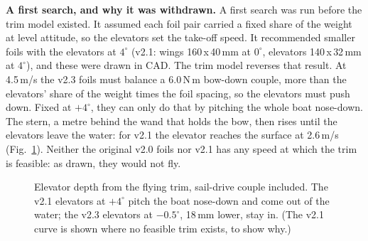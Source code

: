 \documentclass[10pt,twocolumn]{article}
\begin{document}
\noindent\textbf{A first search, and why it was withdrawn.} A first search was run before the trim model existed. It assumed each foil pair carried a fixed share of the weight at level attitude, so the elevators set the take-off speed. It recommended smaller foils with the elevators at $4^\circ$ (v2.1: wings 160\,x\,40\,mm at $0^\circ$, elevators 140\,x\,32\,mm at $4^\circ$), and these were drawn in CAD. The trim model reverses that result. At 4.5\,m/s the v2.3 foils must balance a 6.0\,N\,m bow-down couple, more than the elevators' share of the weight times the foil spacing, so the elevators must push down. Fixed at $+4^\circ$, they can only do that by pitching the whole boat nose-down. The stern, a metre behind the wand that holds the bow, then rises until the elevators leave the water: for v2.1 the elevator reaches the surface at 2.6\,m/s (Fig.~\ref{fig:trim}). Neither the original v2.0 foils nor v2.1 has any speed at which the trim is feasible: as drawn, they would not fly.

\begin{figure}[t]
\centering
{}
\caption{Elevator depth from the flying trim, sail-drive couple included. The v2.1 elevators at $+4^\circ$ pitch the boat nose-down and come out of the water; the v2.3 elevators at $-0.5^\circ$, 18\,mm lower, stay in. (The v2.1 curve is shown where no feasible trim exists, to show why.)}
\label{fig:trim}
\end{figure}
\end{document}
